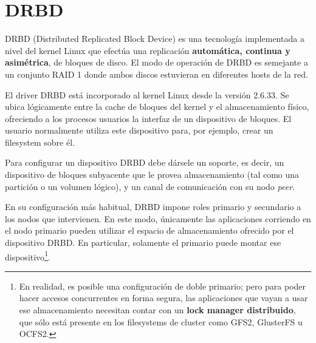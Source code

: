 \section{DRBD}

DRBD (Distributed Replicated Block Device) es una tecnología implementada a nivel del kernel Linux que efectúa una replicación \textbf{automática, continua y asimétrica}, de bloques de disco. El modo de operación de DRBD es semejante a un conjunto RAID 1 donde ambos discos estuvieran en diferentes hosts de la red. 

El driver DRBD está incorporado al kernel Linux desde la versión 2.6.33. Se ubica lógicamente entre la cache de bloques del kernel y el almacenamiento físico, ofreciendo a los procesos usuarios la interfaz de un dispositivo de bloques. El usuario normalmente utiliza este dispositivo para, por ejemplo, crear un filesystem sobre él. 

Para configurar un dispositivo DRBD debe dársele un soporte, es decir, un dispositivo de bloques subyacente que le provea almacenamiento (tal como una partición o un volumen lógico), y un canal de comunicación con su nodo \textit{peer}.
 
En su configuración más habitual, DRBD impone roles primario y secundario a los nodos que intervienen. En este modo, únicamente las aplicaciones corriendo en el nodo primario pueden utilizar el espacio de almacenamiento ofrecido por el dispositivo DRBD. En particular, solamente el primario puede montar ese dispositivo\footnote{En realidad, es posible una configuración de doble primario; pero para poder hacer accesos concurrentes en forma segura, las aplicaciones que vayan a usar ese almacenamiento necesitan contar con un \textbf{lock manager distribuido}, que sólo está presente en los filesystems de cluster como GFS2, GlusterFS u OCFS2.}.

